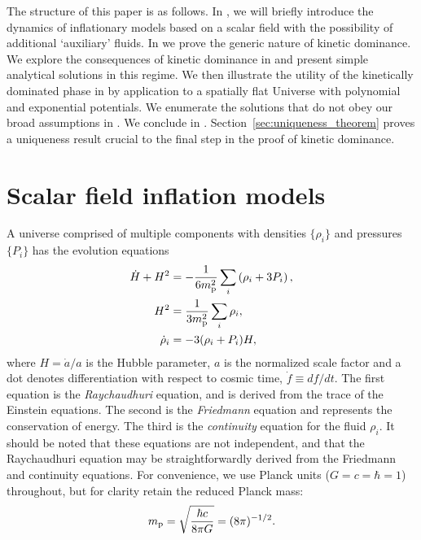 The structure of this paper is as follows.  In
, we will briefly introduce
the dynamics of inflationary models based on a scalar field with the
possibility of additional `auxiliary' fluids.  In
 we prove the
generic nature of kinetic dominance.  We explore the consequences of
kinetic dominance in  and
present simple analytical solutions in this regime.  We then
illustrate the utility of the kinetically dominated phase in
 by application to a
spatially flat Universe with polynomial and exponential potentials.
We enumerate the solutions that do not obey our broad assumptions in
.  We conclude in
. Section~\ref{sec:uniqueness_theorem} proves a
uniqueness result crucial to the final step in the proof of kinetic
dominance.  

\section{Scalar field inflation models}
\label{sec:Scalar_field_inflation_models}
%
A universe comprised of multiple components  with densities
$\{\rho_i\}$ and pressures $\{P_i\}$ has the evolution equations
%
\begin{align}
  \dot{H}+H^2 &= 
  -\frac{1}{6m_{\mathrm{p}}^2}\sum\limits_i\left( \rho_i + 3P_i\right), 
  \label{eqn:Raychaudhuri_rho}
  \\
  H^2 &= 
  \frac{1}{3m_{\mathrm{p}}^2}\sum\limits_i \rho_i, 
  \\
  \dot{\rho}_i 
  &= -3(\rho_i + P_i)H,  
  \label{eqn:conservation}
\end{align}
%
where $H=\dot{a}/a$ is the Hubble parameter, $a$ is the normalized
scale factor and a dot denotes differentiation with respect to cosmic
time, $\dot{f}\equiv df/dt$. The first equation is the {\em
Raychaudhuri}\/ equation, and is derived from the trace of the
Einstein equations. The second is the {\em Friedmann}\/ equation and
represents the conservation of energy. The third is the {\em
continuity}\/ equation for the fluid $\rho_i$. It should be noted that
these equations are not independent, and that the Raychaudhuri
equation may be straightforwardly derived from the Friedmann and
continuity equations.  For convenience, we use Planck units
($G=c=\hbar=1$) throughout, but for clarity retain the reduced Planck
mass: 
%
\[m_{\mathrm{p}} = \sqrt{\frac{\hbar c}{8\pi G}} = (8\pi)^{-1/2}.\]  
%


